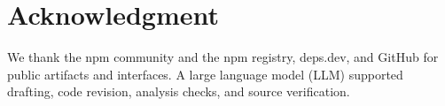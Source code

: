 \section*{Acknowledgment}
We thank the npm community and the npm registry, deps.dev, and GitHub for public artifacts and interfaces. A large language model (LLM) supported drafting, code revision, analysis checks, and source verification.
